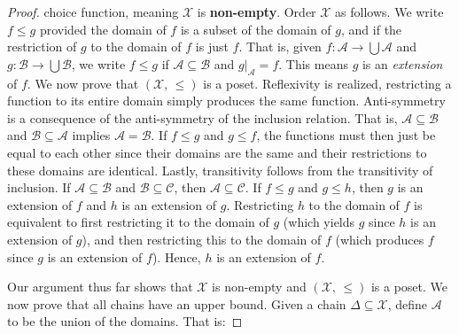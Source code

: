 \documentclass{article}
\theoremstyle{definition}
\begin{document}
\begin{proof}
                choice function, meaning $\mathcal{X}$ is \textbf{non-empty}.
                Order $\mathcal{X}$ as follows. We write
                $f\leq{g}$ provided the domain of $f$ is a subset of the domain
                of $g$, and if the restriction of $g$ to the domain of $f$ is
                just $f$. That is, given
                $f:\mathcal{A}\rightarrow\bigcup\mathcal{A}$
                and
                $g:\mathcal{B}%
                    \rightarrow\bigcup\mathcal{B}$,
                we write $f\leq{g}$ if
                $\mathcal{A}\subseteq\mathcal{B}$ and
                $g|_{\mathcal{A}}=f$. This means $g$ is an
                \textit{extension} of $f$. We now prove that
                $(\mathcal{X},\,\leq)$ is a poset.
                Reflexivity is realized, restricting a function to its entire
                domain simply produces the same function. Anti-symmetry is
                a consequence of the anti-symmetry of the inclusion relation.
                That is,
                $\mathcal{A}\subseteq\mathcal{B}$
                and
                $\mathcal{B}\subseteq\mathcal{A}$
                implies
                $\mathcal{A}=\mathcal{B}$. If
                $f\leq{g}$ and $g\leq{f}$, the functions must then just be
                equal to each other since their domains are the same and their
                restrictions to these domains are identical. Lastly,
                transitivity follows from the transitivity of inclusion.
                If $\mathcal{A}\subseteq\mathcal{B}$ and
                $\mathcal{B}\subseteq\mathcal{C}$,
                then
                $\mathcal{A}\subseteq\mathcal{C}$.
                If $f\leq{g}$ and $g\leq{h}$, then $g$ is an extension of
                $f$ and $h$ is an extension of $g$. Restricting
                $h$ to the domain of $f$ is equivalent to first restricting
                it to the domain of $g$ (which yields $g$ since $h$ is an
                extension of $g$), and then restricting this to the domain of
                $f$ (which produces $f$ since $g$ is an extension of $f$).
                Hence, $h$ is an extension of $f$.
                \par\hfill\par
                Our argument thus far shows that $\mathcal{X}$ is non-empty
                and $(\mathcal{X},\,\leq)$ is a poset. We now prove that
                all chains have an upper bound. Given a chain
                $\Delta\subseteq\mathcal{X}$, define
                $\mathcal{A}$ to be the union of the domains. That is:

\end{proof}
\end{document}

